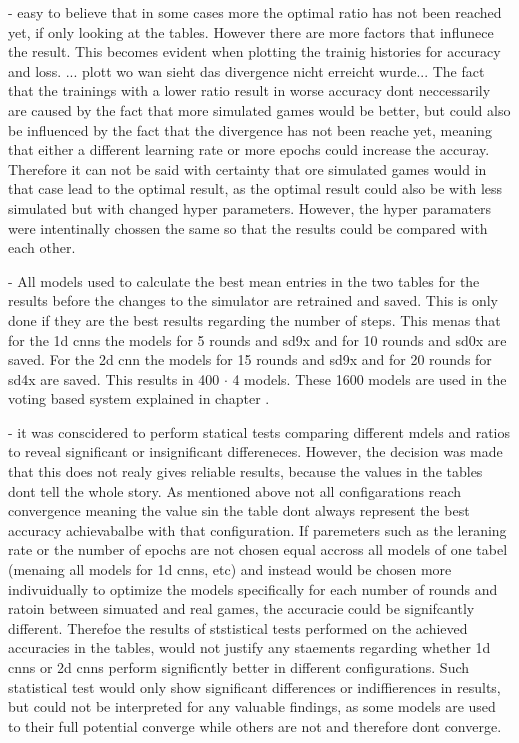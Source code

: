 - easy to believe that in some cases more the optimal ratio has not been reached yet, if only looking at the tables. However there are more factors that influnece the result. This becomes evident when plotting the trainig histories for accuracy and loss. ... plott wo wan sieht das divergence nicht erreicht wurde... The fact that the trainings with a lower ratio result in worse accuracy dont neccessarily are caused by the fact that more simulated games would be better, but could also be influenced by the fact that the divergence has not been reache yet, meaning that either a different learning rate or more epochs could increase the accuray. Therefore it can not be said with certainty that ore simulated games would in that case lead to the optimal result, as the optimal result could also be with less simulated but with changed hyper parameters. However, the hyper paramaters were intentinally chossen the same so that the results could be compared with each other.
 

- All models used to calculate the best mean entries in the two tables for the results before the changes to the simulator are retrained and saved. This is only done if they are the best results regarding the number of steps. This menas that for the 1d cnns the models for 5 rounds and sd9x and for 10 rounds and sd0x are saved. For the 2d cnn the models for 15 rounds and sd9x and for 20 rounds for sd4x are saved. This results in 400 $\cdot$ 4 models. These 1600 models are used in the voting based system explained in chapter . 

- it was conscidered to perform statical tests comparing different mdels and ratios to reveal significant or insignificant differeneces. However, the decision was made that this does not realy gives reliable results, because the values in the tables  dont tell the whole story. As mentioned above not all configarations reach convergence meaning the value sin the table dont always represent the best accuracy achievabalbe with that configuration. If paremeters such as the leraning rate or the number of epochs are not chosen equal accross all models of one tabel (menaing all models for 1d cnns, etc) and instead would be chosen more indivuidually to optimize the models specifically for each number of rounds and ratoin between simuated and real games, the accuracie could be signifcantly different. Therefoe the results of ststistical tests performed on the achieved accuracies in the tables, would not justify any staements regarding whether 1d cnns or 2d cnns perform significntly better in different configurations. Such statistical test would only show significant differences or indiffierences in results, but could not be interpreted for any valuable findings, as some models are used to their full potential converge while others are not and therefore dont converge.  

